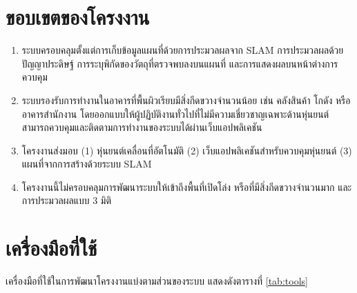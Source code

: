 \documentclass[a4paper,12pt]{report}
\begin{document}
\section{ขอบเขตของโครงงาน}

\begin{enumerate}[label=\arabic*., leftmargin=1.25cm, itemsep=6pt, topsep=6pt]
    \item ระบบครอบคลุมตั้งแต่การเก็บข้อมูลแผนที่ด้วยการประมวลผลจาก SLAM
    การประมวลผลด้วยปัญญาประดิษฐ์ การระบุพิกัดของวัตถุที่ตรวจพบลงบนแผนที่
    และการแสดงผลบนหน้าต่างการควบคุม

    \item ระบบรองรับการทำงานในอาคารที่พื้นผิวเรียบมีสิ่งกีดขวางจำนวนน้อย
    เช่น คลังสินค้า โกดัง หรืออาคารสำนักงาน
    โดยออกแบบให้ผู้ปฏิบัติงานทั่วไปที่ไม่มีความเชี่ยวชาญเฉพาะด้านหุ่นยนต์
    สามารถควบคุมและติดตามการทำงานของระบบได้ผ่านเว็บแอปพลิเคชัน

    \item โครงงานส่งมอบ (1) หุ่นยนต์เคลื่อนที่อัตโนมัติ
    (2) เว็บแอปพลิเคชันสำหรับควบคุมหุ่นยนต์ (3) แผนที่จากการสร้างด้วยระบบ SLAM

    \item โครงงานนี้ไม่ครอบคลุมการพัฒนาระบบให้เข้าถึงพื้นที่เปิดโล่ง
    หรือที่มีสิ่งกีดขวางจำนวนมาก และการประมวลผลแบบ 3 มิติ
\end{enumerate}

\section{เครื่องมือที่ใช้}

เครื่องมือที่ใช้ในการพัฒนาโครงงานแบ่งตามส่วนของระบบ แสดงดังตารางที่ \ref{tab:tools}
\end{document}
